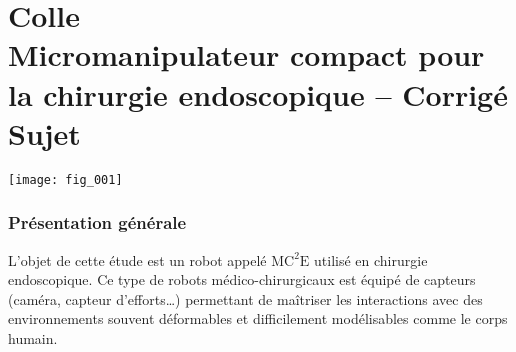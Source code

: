 \chapter*{Colle  \\ 
Micromanipulateur compact pour la chirurgie endoscopique -- \ifprof Corrigé \else Sujet \fi}


\iflivret {} \else
\ifprof  {} \else \fi
\fi
\setcounter{question}{0}

\begin{marginfigure}
\centering
\texttt{[image: fig\_001]}
\end{marginfigure}


\subsection*{Présentation générale}

\ifprof
\else
L’objet de cette étude est un robot appelé $\text{MC}^2\text{E}$ utilisé en chirurgie endoscopique. Ce type de
robots médico-chirurgicaux est équipé de capteurs (caméra, capteur d’efforts…) permettant de maîtriser
les interactions avec des environnements souvent déformables et difficilement modélisables comme le
corps humain.
\fi

%

